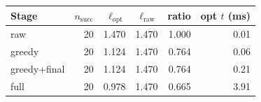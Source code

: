 \begin{tabular}{lrrrrr}
  \toprule
  Stage & $n_\mathrm{succ}$ & $\ell_{\mathrm{opt}}$ & $\ell_{\mathrm{raw}}$ & ratio & opt $t$ (ms) \\
  \midrule
  raw & 20 & 1.470 & 1.470 & 1.000 & 0.01 \\
  greedy & 20 & 1.124 & 1.470 & 0.764 & 0.06 \\
  greedy+final & 20 & 1.124 & 1.470 & 0.764 & 0.21 \\
  full & 20 & 0.978 & 1.470 & 0.665 & 3.91 \\
  \bottomrule
\end{tabular}
